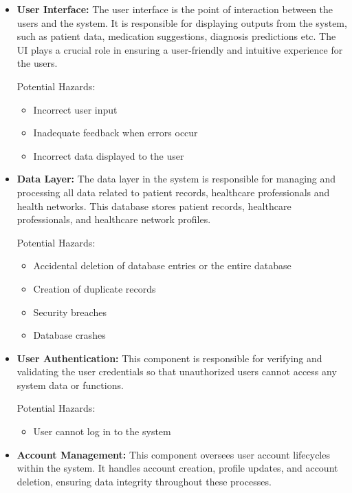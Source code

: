 \documentclass{article}
\begin{document}
\begin{itemize}
 
    \item \textbf{User Interface:}
    The user interface is the point of interaction between the users and the system. It is responsible for displaying outputs from the system, such as patient data, medication suggestions, diagnosis predictions etc. The UI plays a crucial role in ensuring a user-friendly and intuitive experience for the users.
    
    Potential Hazards:
    \begin{itemize}
        \item Incorrect user input
        \item Inadequate feedback when errors occur
        \item Incorrect data displayed to the user
    \end{itemize}

    \item \textbf{Data Layer:}
    The data layer in the system is responsible for managing and processing all data related to patient records, healthcare professionals and health networks. This database stores patient records, healthcare professionals, and healthcare network profiles.

    Potential Hazards:
    \begin{itemize}
        \item Accidental deletion of database entries or the entire database
        \item Creation of duplicate records
        \item Security breaches
        \item Database crashes   
    \end{itemize}
    
    \item \textbf{User Authentication:}
    This component is responsible for verifying and validating the user credentials so that unauthorized users cannot access any system data or functions. 
    
    Potential Hazards:
    \begin{itemize}
        \item User cannot log in to the system
    \end{itemize}
    
    \item \textbf{Account Management:}
    This component oversees user account lifecycles within the system. It handles account creation, profile updates, and account deletion, ensuring data integrity throughout these processes.
    

\end{itemize}
\end{document}
